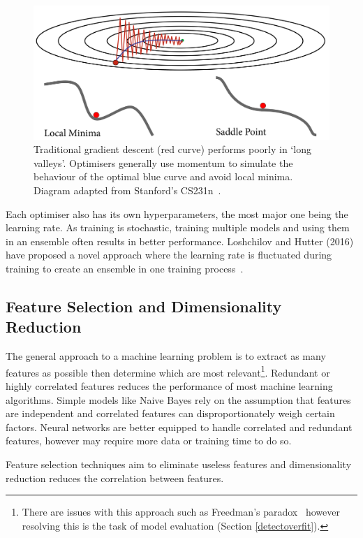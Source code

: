 \documentclass[12pt, twoside]{book}
\begin{document}
\begin{figure}[h]
	\centering\includegraphics[width=0.82\linewidth]{gradescent.png}
	\caption{Traditional gradient descent (red curve) performs poorly in `long valleys'. Optimisers generally use momentum to simulate the behaviour of the optimal blue curve and avoid local minima. Diagram adapted from Stanford's CS231n~\cite{cs231n}.}
\end{figure}

Each optimiser also has its own hyperparameters, the most major one being the learning rate. As training is stochastic, training multiple models and using them in an ensemble often results in better performance. Loshchilov and Hutter (2016) have proposed a novel approach where the learning rate is fluctuated during training to create an ensemble in one training process~\cite{sgdrestarts}. 


\subsection{Feature Selection and Dimensionality Reduction}
The general approach to a machine learning problem is to extract as many features as possible then determine which are most relevant\footnote{There are issues with this approach such as Freedman's paradox~\cite{freedmanparadox} however resolving this is the task of model evaluation (Section \ref{detectoverfit}).}. Redundant or highly correlated features reduces the performance of most machine learning algorithms. Simple models like Naive Bayes rely on the assumption that features are independent and correlated features can disproportionately weigh certain factors. Neural networks are better equipped to handle correlated and redundant features, however may require more data or training time to do so. 


\begin{highlight}
	Feature selection techniques aim to eliminate useless features and dimensionality reduction reduces the correlation between features.
\end{highlight} 
\end{document}
